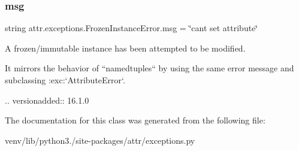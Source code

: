 \subsubsection{\texorpdfstring{msg}{msg}}
{\footnotesize\ttfamily string attr.\+exceptions.\+Frozen\+Instance\+Error.\+msg = \char`\"{}can\textquotesingle{}t set attribute\char`\"{}\hspace{0.3cm}{\ttfamily [static]}}

\begin{DoxyVerb}A frozen/immutable instance has been attempted to be modified.

It mirrors the behavior of ``namedtuples`` by using the same error message
and subclassing :exc:`AttributeError`.

.. versionadded:: 16.1.0
\end{DoxyVerb}
 

The documentation for this class was generated from the following file\+:\begin{DoxyCompactItemize}
\item 
venv/lib/python3./site-\/packages/attr/exceptions.\+py\end{DoxyCompactItemize}
